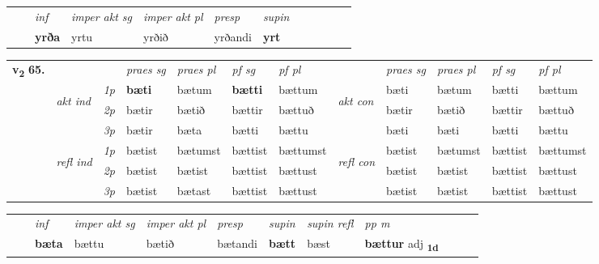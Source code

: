 \begin{tabular}{llllllllllll}
 & & \textit{inf} & \textit{imper akt sg} & \textit{imper akt pl}   & \textit{presp} & \textit{supin}       \\*
  & & \textbf{yrða} & yrtu  & yrðið   & yrðandi &  \textbf{yrt}   \\*
\cmidrule{1-12}
\end{tabular}



\begin{tabular}{llllllllllll} \toprule
\multirow{4}{*}{{{\textbf{v{\textsubscript{2}}} \Large{\textbf{65.}}}}}  & &   &  \textit{praes sg}  & \textit{praes pl}  &\textit{ pf sg} & \textit{pf pl} &  &  \textit{praes sg}  & \textit{praes pl}  & \textit{pf sg} & \textit{pf pl } \\*
	\cmidrule{4-7} \cmidrule{9-12}
 & \multirow{3}{*}{\begin{turn}{90}\textit{akt ind}\end{turn}} & {\textit{1p}} & \textbf{bæti} & bætum    & \textbf{bætti} & bættum & \multirow{3}{*}{\begin{turn}{90}\textit{akt con}\end{turn}} &bæti & bætum & bætti & bættum\\*
& &  {\textit{2p}} &  bætir  & bætið   & bættir & bættuð & & bætir & bætið & bættir & bættuð \\*
& &  {\textit{3p}} & bætir & bæta   & bætti & bættu & & bæti & bæti& bætti & bættu  \\*
\cmidrule{4-7} \cmidrule{9-12}
 &\multirow{3}{*}{\begin{turn}{90}\textit{refl ind}\end{turn}} & {\textit{1p}} & bætist & bætumst    & bættist & bættumst & \multirow{3}{*}{\begin{turn}{90}\textit{refl con}\end{turn}}  &bætist & bætumst & bættist & bættumst\\*
 &&  {\textit{2p}} &  bætist  & bætist   & bættist & bættust & &bætist & bætist & bættist & bættust \\*
& &  {\textit{3p}} & bætist & bætast   & bættist & bættust & & bætist & bætist& bættist & bættust  \\*
\cmidrule{4-7} \cmidrule{9-12}
\end{tabular}


\begin{tabular}{llllllllllll}
 & & \textit{inf} & \textit{imper akt sg} & \textit{imper akt pl}   & \textit{presp} & \textit{supin} & \textit{supin refl} & \textit{pp m}     \\*
  & & \textbf{bæta} & bættu  & bætið   & bætandi &  \textbf{bætt} & bæst & \textbf{bættur} adj \textbf{\textsubscript{1d}} \\*
\cmidrule{1-12}
\end{tabular}



